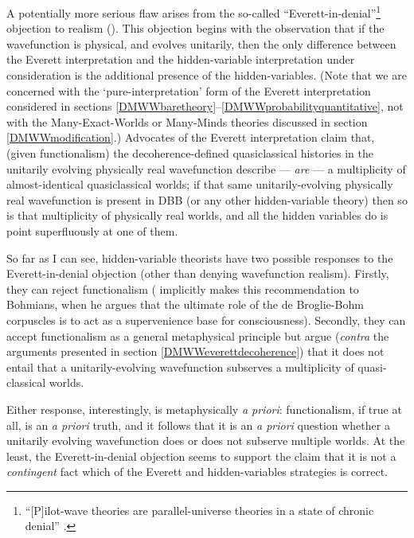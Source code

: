 \documentclass[12pt]{article}
\begin{document}
A potentially more serious flaw arises from the so-called ``Everett-in-denial''\footnote{``[P]ilot-wave theories are parallel-universe theories in a state of chronic denial'' \cite[p.\,225]{deutschlockwood}.} objection to realism (). This objection begins with the observation that if the wavefunction is physical, and evolves unitarily, then the only difference between the Everett interpretation and the hidden-variable interpretation under consideration is the additional presence of the hidden-variables. (Note that we are concerned with the `pure-interpretation' form of the Everett interpretation considered in sections \ref{DMWWbaretheory}--\ref{DMWWprobabilityquantitative}, not with the Many-Exact-Worlds or Many-Minds theories discussed in section \ref{DMWWmodification}.) Advocates of the Everett interpretation claim that, (given functionalism) the decoherence-defined quasiclassical histories in the unitarily evolving physically real wavefunction describe --- \emph{are} --- a multiplicity of almost-identical quasiclassical worlds; if that same unitarily-evolving physically real wavefunction is present in DBB (or any other hidden-variable theory) then so is that multiplicity of physically real worlds, and all the hidden variables do is point superfluously at one of them. 

So far as I can see, hidden-variable theorists have two possible responses to the Everett-in-denial objection (other than denying wavefunction realism). Firstly, they can reject functionalism ( implicitly makes this recommendation to Bohmians, when he argues that the ultimate role of the de Broglie-Bohm corpuscles is to act as a supervenience base for consciousness). Secondly, they can accept functionalism as a general metaphysical principle but argue  (\emph{contra} the arguments presented in section \ref{DMWWeverettdecoherence}) that  it does not entail that a unitarily-evolving wavefunction subserves a multiplicity of quasi-classical worlds. 

Either response, interestingly, is metaphysically \emph{a priori}: functionalism, if true at all, is an \emph{a priori} truth, and it follows that it is an \emph{a priori} question whether a unitarily evolving wavefunction does or does not subserve multiple worlds. At the least, the Everett-in-denial objection seems to support the claim that it is not a \emph{contingent} fact which of the Everett and hidden-variables strategies is correct.
\end{document}
